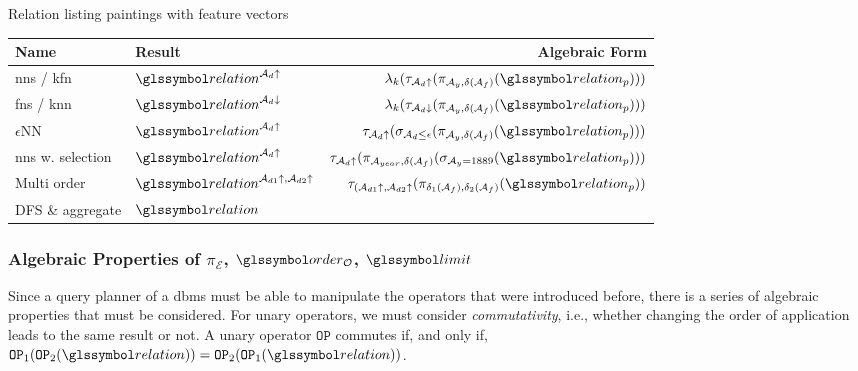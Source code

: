 \begin{example}[label=example:rel_painting_w_features]{Relation listing paintings with feature vectors}{}
    \begin{center}
        \begin{tabular}{||l l r ||} 
         \hline
         Name & Result & Algebraic Form \\
         \hline\hline
         \acrshort{nns} / \acrshort{kfn} & $\relation^{\mathcal{A}_d\uparrow}$ & $\lambda_k (\tau_{\mathcal{A}_d\uparrow} ( \pi_{\mathcal{A}_{y}, \delta(\mathcal{A}_{f})}  ( \relation_p)))$  \\ 
         \hline
         \acrshort{fns} / \acrshort{knn}& $\relation^{\mathcal{A}_d\downarrow}$ & $\lambda_k (\tau_{\mathcal{A}_d\downarrow} ( \pi_{\mathcal{A}_{y}, \delta(\mathcal{A}_{f})}  ( \relation_p)))$   \\
         \hline
         $\epsilon$NN~\cite{Giangreco:2018thesis} & $\relation^{\mathcal{A}_d\uparrow}$ & $\tau_{\mathcal{A}_d\uparrow} ( \sigma_{\mathcal{A}_d \leq \epsilon} ( \pi_{\mathcal{A}_{y}, \delta(\mathcal{A}_{f})} ( \relation_p)) )$  \\
         \hline
         \acrshort{nns} w. selection & $\relation^{\mathcal{A}_d\uparrow}$ &  $\tau_{\mathcal{A}_d\uparrow} ( \pi_{\mathcal{A}_{year}, \delta(\mathcal{A}_{f})} ( \sigma_{\mathcal{A}_{y} = 1889} ( \relation_p)) )$\\
         \hline
         Multi order & $\relation^{\mathcal{A}_{d1}\uparrow,\mathcal{A}_{d2}\uparrow}$ & $\tau_{(\mathcal{A}_{d1}\uparrow,\mathcal{A}_{d2}\uparrow} ( \pi_{\delta_1(\mathcal{A}_{f}), \delta_2(\mathcal{A}_{f})}  ( \relation_p))$ \\ 
         \hline
         DFS \& aggregate & $\relation$ & \\ 
         \hline
        \end{tabular}
    \end{center}

\end{example}

\subsubsection{Algebraic Properties of  \texorpdfstring{$\pi_{\mathcal{E}}$}{Pi}, \texorpdfstring{$\order_{\mathcal{O}}$}{Tau}, \texorpdfstring{$\limit$}{Lambda}}

Since a query planner of a \acrshort{dbms} must be able to manipulate the operators that were introduced before, there is a series of algebraic properties that must be considered. For unary operators, we must consider \emph{commutativity}, i.e., whether changing the order of application leads to the same result or not. A unary operator $\mathtt{OP}$ commutes if, and only if, $ \mathtt{OP}_1 (\mathtt{OP}_2 ( \relation)) = \mathtt{OP}_2 (\mathtt{OP}_1 (\relation))$.

